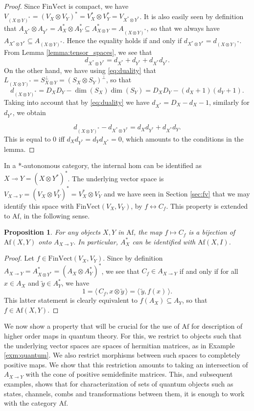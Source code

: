 \documentclass[12pt]{article}
\newtheorem{prop}{Proposition}
\theoremstyle{definition}
\theoremstyle{remark}
\def\<{\langle\,}
\def\>{\,\rangle}
\def \Af{\mathrm{Af}}
\def \FV{\mathrm{FinVect}}
\begin{document}
\begin{proof} Since $\FV$ is compact, we have $V_{(X\otimes Y)^*}=(V_X\otimes
V_Y)^*=V_X^*\otimes V_Y^*=V_{X^*\otimes Y^*}$. It is also easily seen by definition that
$A_{X^*}\otimes A_{Y^*}=A^*_X\otimes A^*_Y\subseteq A^*_{X\otimes Y}=A_{(X\otimes Y)^*}$, so that we always have $A_{X^*\otimes
Y^*}\subseteq A_{(X\otimes Y)^*}$.  Hence the equality holds if and
only if $d_{X^*\otimes Y^*}=d_{(X\otimes Y)^*}$. From Lemma
\ref{lemma:tensor_spaces}, we see that
\[
d_{X^*\otimes Y^*}=d_{X^*}+d_{Y^*}+d_{X^*}d_{Y^*}.
\]
On the other hand, we have using \eqref{eq:duality} that $L_{(X\otimes Y)^*}=S_{X\otimes
Y}^\perp=(S_X\otimes S_Y)^\perp$, so that
\[
d_{(X\otimes Y)^*}=D_XD_Y-\dim(S_X)\dim(S_Y)=D_XD_Y-(d_X+1)(d_Y+1).
\]
Taking into account that by \eqref{eq:duality} we have $d_{X^*}=D_X-d_{X}-1$, similarly
for $d_{Y^*}$, we obtain

\[
d_{(X\otimes Y)^*}-d_{X^*\otimes Y^*}=d_Xd_{Y^*}+d_{X^*}d_Y.
\]
This is equal to 0 iff $d_Xd_{Y^*}=d_Yd_{X^*}=0$, which amounts to the conditions in the
lemma.

\end{proof}



In a *-autonomous category, the internal hom can be identified as $X\multimap Y=(X\otimes
Y^*)^*$. The underlying vector space is $V_{X\multimap Y}=(V_X\otimes V_Y^*)^*=V_X^*\otimes V_Y$
and we have seen in Section \ref{sec:fv} that we may identify this space with
$\FV(V_X,V_Y)$, by $f \leftrightarrow C_f$. This property is extended to $\Af$, in the
following sense.

\begin{prop}\label{prop:ihom_morphisms} For any objects $X,Y$ in $\Af$, the map $f\mapsto C_f$ is a bijection
of $\Af(X,Y)$ onto $A_{X\multimap Y}$. In particular,  $A^*_X$ can be identified with
$\Af(X,I)$.

\end{prop}

\begin{proof} Let $f\in \FV(V_X,V_Y)$. Since by definition $A_{X\multimap Y}=A^*_{X\otimes
Y^*}=(A_X\otimes A_Y^*)^*$, we see that $C_f\in A_{X\multimap Y}$ if and only
if for all $x\in A_X$ and $\tilde y\in A^*_Y$, we have
\[
1=\<C_f, x\otimes \tilde y\>=\<\tilde y,f(x)\>.
\]
This latter statement is clearly equivalent to $f(A_X)\subseteq A_Y$, so that $f\in
\Af(X,Y)$. 

\end{proof}

We now show a property that will be  crucial for the use of  $\Af$ for  description of  higher order maps in quantum
theory. For this, we restrict to objects such that the underlying vector spaces are spaces
of hermitian matrices, as in Example
\ref{exm:quantum}. We also restrict morphisms between such spaces to completely positive maps. We show that this restriction
amounts to taking an intersection of $A_{X\multimap Y}$ with the cone of positive semidefinite
matrices. {This, and subsequent examples,  shows that for characterization of sets  of quantum
objects such as states, channels, combs and transformations between them, it is enough to
work with the category $\Af$.} 
\end{document}
